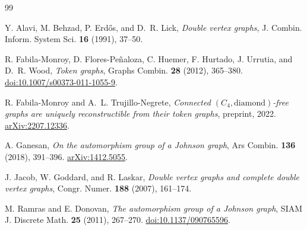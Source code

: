 \documentclass[11pt]{amsart}
\begin{document}
\begin{thebibliography}{99}

Y. Alavi, M. Behzad, P. Erd\H{o}s, and D.~R. Lick,
\emph{Double vertex graphs},
J. Combin. Inform. System Sci. \textbf{16} (1991), 37--50.

R. Fabila-Monroy, D. Flores-Pe\~naloza, C. Huemer, F. Hurtado, J. Urrutia, and D.~R. Wood,
\emph{Token graphs},
Graphs Combin. \textbf{28} (2012), 365--380.
\href{https://doi.org/10.1007/s00373-011-1055-9}{doi:10.1007/s00373-011-1055-9}.

R. Fabila-Monroy and A.~L. Trujillo-Negrete,
\emph{Connected $(C_4,\mathrm{diamond})$-free graphs are uniquely reconstructible from their token graphs},
preprint, 2022.
\href{https://arxiv.org/abs/2207.12336}{arXiv:2207.12336}.

A. Ganesan,
\emph{On the automorphism group of a Johnson graph},
Ars Combin. \textbf{136} (2018), 391--396.
\href{https://arxiv.org/abs/1412.5055}{arXiv:1412.5055}.

J. Jacob, W. Goddard, and R. Laskar,
\emph{Double vertex graphs and complete double vertex graphs},
Congr. Numer. \textbf{188} (2007), 161--174.

M. Ramras and E. Donovan,
\emph{The automorphism group of a Johnson graph},
SIAM J. Discrete Math. \textbf{25} (2011), 267--270.
\href{https://doi.org/10.1137/090765596}{doi:10.1137/090765596}.

\end{thebibliography}
\end{document}
